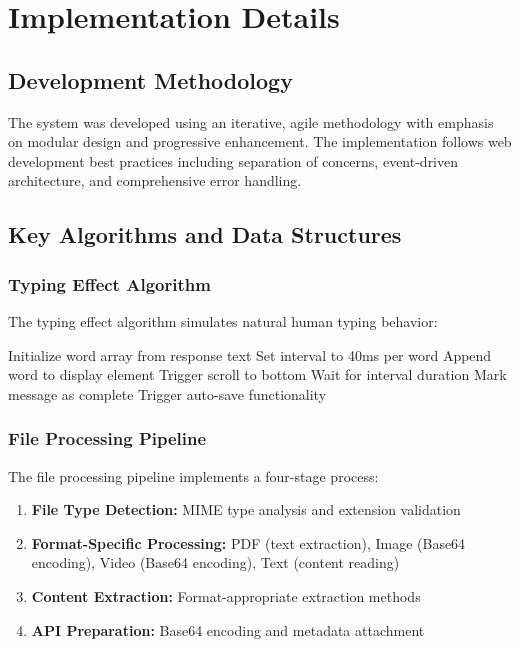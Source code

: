\documentclass[conference]{IEEEtran}
\begin{document}
\section{Implementation Details}

\subsection{Development Methodology}
The system was developed using an iterative, agile methodology with emphasis on modular design and progressive enhancement. The implementation follows web development best practices including separation of concerns, event-driven architecture, and comprehensive error handling.

\subsection{Key Algorithms and Data Structures}

\subsubsection{Typing Effect Algorithm}
The typing effect algorithm simulates natural human typing behavior:
\begin{algorithmic}
\STATE Initialize word array from response text
\STATE Set interval to 40ms per word
    \STATE Append word to display element
    \STATE Trigger scroll to bottom
    \STATE Wait for interval duration
\ENDFOR
\STATE Mark message as complete
\STATE Trigger auto-save functionality
\end{algorithmic}

\subsubsection{File Processing Pipeline}
The file processing pipeline implements a four-stage process:
\begin{enumerate}[itemsep=0pt, parsep=0pt]
    \item \textbf{File Type Detection:} MIME type analysis and extension validation
    \item \textbf{Format-Specific Processing:} PDF (text extraction), Image (Base64 encoding), Video (Base64 encoding), Text (content reading)
    \item \textbf{Content Extraction:} Format-appropriate extraction methods
    \item \textbf{API Preparation:} Base64 encoding and metadata attachment
\end{enumerate}
\end{document}
